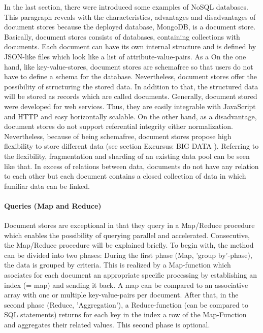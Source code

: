 In the last section, there were introduced some examples of NoSQL databases. This paragraph reveals with the characteristics, advantages and disadvantages of document stores because the deployed database, MongoDB, is a document store. 
Basically, document stores consists of databases, containing collections with documents. Each document can have its own internal structure and is defined by JSON-like files which look like a list of attribute-value-pairs. As a 
On the one hand, like key-value-stores, document stores are schemafree so that users do not have to define a schema for the database. Nevertheless, document stores offer the possibility of structuring the stored data. In addition to that, the structured data will be stored as records which are called documents. Generally, document stored were developed for web services. Thus, they are easily integrable with JavaScript and \ac{HTTP} and easy horizontally scalable. 
On the other hand, as a disadvantage, document stores do not support referential integrity either normalization.
Nevertheless, because of being schemafree, document stores propose high flexibility to store different data (see section Excursus: BIG DATA \pageref{bigdata}). Referring to the flexibility, fragmentation and sharding of an existing data pool can be seen like that. In excess of relations between data, documents do not have any relation to each other but each document contains a closed collection of data in which familiar data can be linked.

\paragraph{Queries (Map and Reduce)}

Document stores are exceptional in that they query in a Map/Reduce procedure which enables the possibility of querying parallel and accelerated. Consecutive, the Map/Reduce procedure will be explained briefly. 
To begin with, the method can be divided into two phases: During the first phase (Map, 'group by'-phase), the data is grouped by criteria. This is realized by a Map-function which asociates for each document an appropriate specific processing by establishing an index (= map) and sending it back. A map can be compared to an associative array with one or multiple key-value-pairs per document.  
After that, in the second phase (Reduce, 'Aggregation'), a Reduce-function (can be compared to SQL statements) returns for each key in the index a row of the Map-Function and aggregates their related values. This second phase is optional.

